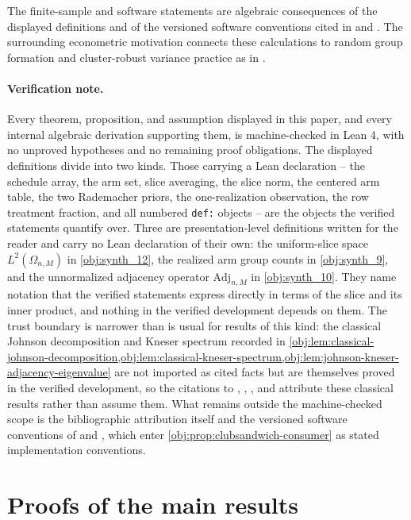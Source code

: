 \documentclass[11pt]{article}
\begin{document}
The finite-sample and software statements are algebraic consequences of the displayed definitions and of the versioned software conventions cited in \citet{ClubSandwich2026} and \citet{Sandwich2026}. The surrounding econometric motivation connects these calculations to random group formation and cluster-robust variance practice as in \citet{FuSamiiWang2026}.

\paragraph{Verification note.}
Every theorem, proposition, and assumption displayed in this paper, and every internal algebraic derivation supporting them, is machine-checked in Lean 4, with no unproved hypotheses and no remaining proof obligations. The displayed definitions divide into two kinds. Those carrying a Lean declaration -- the schedule array, the arm set, slice averaging, the slice norm, the centered arm table, the two Rademacher priors, the one-realization observation, the row treatment fraction, and all numbered \texttt{def:} objects -- are the objects the verified statements quantify over. Three are presentation-level definitions written for the reader and carry no Lean declaration of their own: the uniform-slice space \(L^2(\Omega_{n,M})\) in \cref{obj:synth_12}, the realized arm group counts in \cref{obj:synth_9}, and the unnormalized adjacency operator \(\mathrm{Adj}_{n,M}\) in \cref{obj:synth_10}. They name notation that the verified statements express directly in terms of the slice and its inner product, and nothing in the verified development depends on them. The trust boundary is narrower than is usual for results of this kind: the classical Johnson decomposition and Kneser spectrum recorded in \cref{obj:lem:classical-johnson-decomposition,obj:lem:classical-kneser-spectrum,obj:lem:johnson-kneser-adjacency-eigenvalue} are not imported as cited facts but are themselves proved in the verified development, so the citations to \citet{Delsarte1973}, \citet{BrouwerCohenNeumaier1989}, \citet{Filmus2016}, and \citet{BrouwerEtAl2018} attribute these classical results rather than assume them. What remains outside the machine-checked scope is the bibliographic attribution itself and the versioned software conventions of \citet{ClubSandwich2026} and \citet{Sandwich2026}, which enter \cref{obj:prop:clubsandwich-consumer} as stated implementation conventions.


\section{Proofs of the main results}\label{sec:deferred-proofs}
\end{document}
